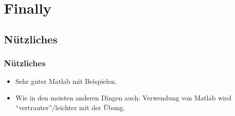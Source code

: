       

  \section{Finally}

  \subsection{Nützliches}
  \begin{frame}
      \frametitle{Nützliches}
      \begin{itemize}
          \item Sehr guter Matlab  mit Beispielen.
          \item Wie in den meisten anderen Dingen auch: Verwendung von Matlab wird ``vertrauter''/leichter mit der Übung.
      \end{itemize}
  \end{frame}




